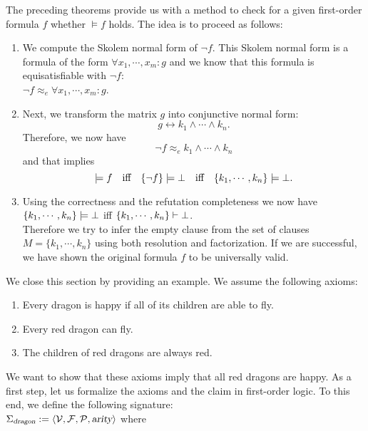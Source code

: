 The preceding theorems provide us with a method to check for a given first-order formula $f$ whether
 $\models f$ holds.  The idea is to proceed as follows:
\begin{enumerate}
\item We compute the Skolem normal form of $\neg f$.  This Skolem normal form is a formula of the form
      $\forall x_1, \cdots, x_m \colon g$ and we know that this formula is equisatisfiable with $\neg f$:
      \\[0.2cm]
      \hspace*{1.3cm} $\neg f \approx_e \forall x_1, \cdots, x_m \colon g$.
\item Next, we transform the matrix $g$ into  conjunctive normal form: 
      \[ g \leftrightarrow k_1 \wedge \cdots \wedge k_n. \]
      Therefore, we now have 
      \[ \neg f \approx_e k_1 \wedge \cdots \wedge k_n \] 
      and that implies 
      \[  
          \models f                           \quad \mbox{iff} \quad
          \{\neg f\} \models \bot          \quad \mbox{iff} \quad 
          \{k_1,\cdots,k_n\} \models \bot.
      \]
\item Using the correctness and the refutation completeness we now have
      \\[0.2cm]
      \hspace*{1.3cm} 
      $\{k_1,\cdots,k_n\} \models \bot$ \quad iff \quad 
      $\{k_1,\cdots,k_n\} \vdash \bot$. \\[0.2cm]
      Therefore we try to infer the empty clause from the set of clauses  $M = \{ k_1, \cdots, k_n \}$ using both
      resolution and factorization.  If we are successful, we have shown the original formula $f$ to be
      universally valid.
\end{enumerate}
We close this section by providing an example.
We assume the following axioms:
\begin{enumerate}
\item Every dragon is happy if all of its children are able to fly.
\item Every red dragon can fly.
\item The children of red dragons are always red.
\end{enumerate}
We want to show that these axioms imply that all red dragons are happy.
As a first step, let us formalize the axioms and the claim in first-order logic.
To this end, we define the following signature: \\[0.2cm]
\hspace*{1.3cm}  $\Sigma_\textsl{dragon} := \langle \mathcal{V}, \mathcal{F}, \mathcal{P}, \textsl{arity} \rangle$ \quad where
